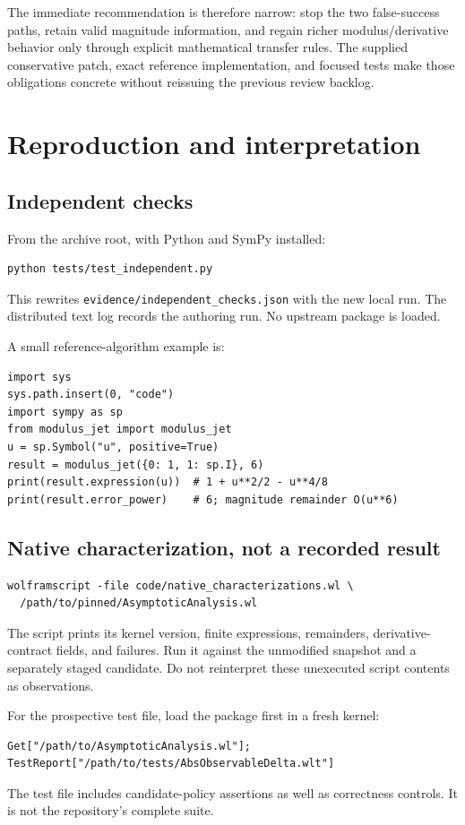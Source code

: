 \documentclass[11pt,a4paper]{article}
\newcommand{\code}[1]{\nolinkurl{#1}}
\begin{document}
The immediate recommendation is therefore narrow: stop the two false-success paths, retain valid magnitude information, and regain richer modulus/derivative behavior only through explicit mathematical transfer rules. The supplied conservative patch, exact reference implementation, and focused tests make those obligations concrete without reissuing the previous review backlog.

\appendix
\section{Reproduction and interpretation}
\subsection{Independent checks}
From the archive root, with Python and SymPy installed:
\begin{lstlisting}
python tests/test_independent.py
\end{lstlisting}
This rewrites \code{evidence/independent_checks.json} with the new local run. The distributed text log records the authoring run. No upstream package is loaded.

A small reference-algorithm example is:
\begin{lstlisting}
import sys
sys.path.insert(0, "code")
import sympy as sp
from modulus_jet import modulus_jet
u = sp.Symbol("u", positive=True)
result = modulus_jet({0: 1, 1: sp.I}, 6)
print(result.expression(u))  # 1 + u**2/2 - u**4/8
print(result.error_power)    # 6; magnitude remainder O(u**6)
\end{lstlisting}

\subsection{Native characterization, not a recorded result}
\begin{lstlisting}
wolframscript -file code/native_characterizations.wl \
  /path/to/pinned/AsymptoticAnalysis.wl
\end{lstlisting}
The script prints its kernel version, finite expressions, remainders, derivative-contract fields, and failures. Run it against the unmodified snapshot and a separately staged candidate. Do not reinterpret these unexecuted script contents as observations.

For the prospective test file, load the package first in a fresh kernel:
\begin{lstlisting}
Get["/path/to/AsymptoticAnalysis.wl"];
TestReport["/path/to/tests/AbsObservableDelta.wlt"]
\end{lstlisting}
The test file includes candidate-policy assertions as well as correctness controls. It is not the repository's complete suite.
\end{document}
